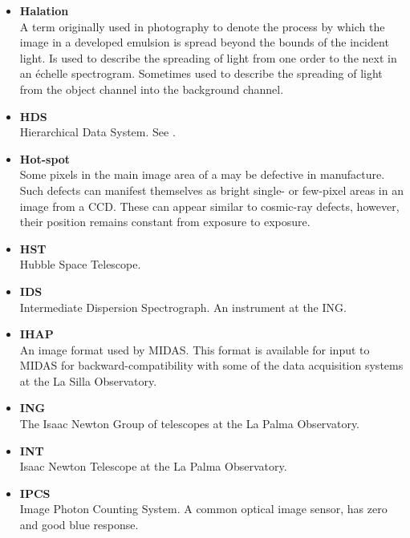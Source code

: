 \documentclass[twoside,11pt]{starlink}
\begin{document}
\begin{itemize}
\item {\bf\label{gl_halation}Halation}\\
      A term originally used in photography to denote the process by which
      the image in a developed emulsion is spread beyond the bounds of the
      incident light.  Is used to describe the spreading of light from
      one order to the next in an \'{e}chelle spectrogram.  Sometimes used
      to describe the spreading of light from the object channel into the
      background channel.

\item {\bf\label{gl_hds}HDS}\\
      Hierarchical Data System.  See .

\item {\bf\label{gl_hotspot}Hot-spot}\\
      Some pixels in the main image area of a  may
      be defective in manufacture.  Such defects can manifest themselves
      as bright single- or few-pixel areas in an image from a CCD\@.
      These can appear similar to cosmic-ray defects, however, their
      position remains constant from exposure to exposure.

\item {\bf\label{gl_hst}HST}\\
      Hubble Space Telescope.

\item {\bf\label{gl_ids}IDS}\\
      Intermediate Dispersion Spectrograph.  An instrument at the
      ING\@.

\item {\bf\label{gl_ihap}IHAP}\\
      An image format used by MIDAS.  This format is available for
      input to MIDAS for backward-compatibility with some of the
      data acquisition systems at the La Silla Observatory.

\item {\bf\label{gl_ing}ING}\\
      The Isaac Newton Group of telescopes at the La Palma Observatory.

\item {\bf\label{gl_int}INT}\\
      Isaac Newton Telescope at the La Palma Observatory.

\item {\bf\label{gl_ipcs}IPCS}\\
      Image Photon Counting System.  A common optical image sensor,
      has zero  and good blue
      response.


\end{itemize}
\end{document}
